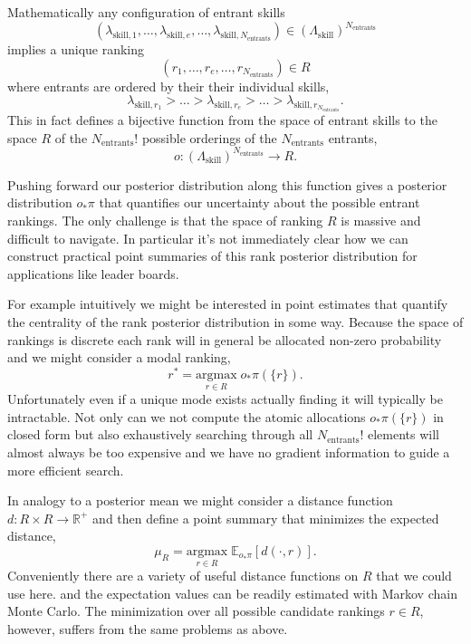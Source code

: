 \documentclass[
  letterpaper,
  DIV=11,
  numbers=noendperiod]{scrartcl}
\begin{document}
Mathematically any configuration of entrant skills \[
( \lambda_{\mathrm{skill}, 1}, \ldots,
  \lambda_{\mathrm{skill}, e}, \ldots,
  \lambda_{\mathrm{skill}, N_{\mathrm{entrants}}} )
\in \left( \Lambda_{\mathrm{skill}} \right)^{N_{\mathrm{entrants}}}
\] implies a unique ranking \[
(r_{1}, \ldots, r_{e}, \ldots, r_{N_{\mathrm{entrants}}}) \in R
\] where entrants are ordered by their their individual skills, \[
\lambda_{\mathrm{skill}, r_{1}} > \ldots >
\lambda_{\mathrm{skill}, r_{e}} > \ldots >
\lambda_{\mathrm{skill}, r_{N_{\mathrm{entrants}}}}.
\] This in fact defines a bijective function from the space of entrant
skills to the space \(R\) of the \(N_{\mathrm{entrants}}!\) possible
orderings of the \(N_{\mathrm{entrants}}\) entrants, \[
o : \left( \Lambda_{\mathrm{skill}} \right)^{N_{\mathrm{entrants}}}
    \rightarrow R.
\]

Pushing forward our posterior distribution along this function gives a
posterior distribution \(o_{*} \pi\) that quantifies our uncertainty
about the possible entrant rankings. The only challenge is that the
space of ranking \(R\) is massive and difficult to navigate. In
particular it's not immediately clear how we can construct practical
point summaries of this rank posterior distribution for applications
like leader boards.

For example intuitively we might be interested in point estimates that
quantify the centrality of the rank posterior distribution in some way.
Because the space of rankings is discrete each rank will in general be
allocated non-zero probability and we might consider a modal ranking, \[
r^{*} = \underset{r \in R}{\mathrm{argmax}} \; o_{*} \pi( \{ r \} ).
\] Unfortunately even if a unique mode exists actually finding it will
typically be intractable. Not only can we not compute the atomic
allocations \(o_{*} \pi( \{ r \} )\) in closed form but also
exhaustively searching through all \(N_{\mathrm{entrants}}!\) elements
will almost always be too expensive and we have no gradient information
to guide a more efficient search.

In analogy to a posterior mean we might consider a distance function
\(d : R \times R \rightarrow \mathbb{R}^{+}\) and then define a point
summary that minimizes the expected distance, \[
\mu_{R}
=
\underset{r \in R}{\mathrm{argmax}} \; \mathbb{E}_{o_{*} \pi}[ d( \cdot, r) ].
\] Conveniently there are a variety of useful distance functions on
\(R\) that we could use here. and the expectation values can be readily
estimated with Markov chain Monte Carlo. The minimization over all
possible candidate rankings \(r \in R\), however, suffers from the same
problems as above.
\end{document}
